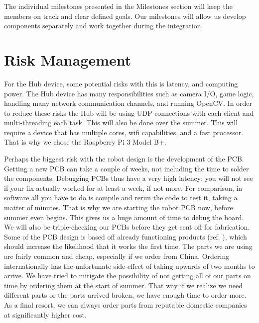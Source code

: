 \documentclass[11pt]{ieeeconf}
\begin{document}
The individual milestones presented in the Milestones section will keep the members on track and clear defined goals. Our milestones will allow us develop components separately and work together during the integration. 

\section{Risk Management}

For the Hub device, some potential risks with this is latency, and computing power. The Hub device has many responsibilities such as camera I/O, game logic, handling many network communication channels, and running OpenCV. In order to reduce these risks the Hub will be using UDP connections with each client and multi-threading each task. This will also be done over the summer. This will require a device that has multiple cores, wifi capabilities, and a fast processor. That is why we chose the Raspberry Pi 3 Model B+.

Perhaps the biggest risk with the robot design is the development of the PCB. Getting a new PCB can take a couple of weeks, not including the time to solder the components. Debugging PCBs thus have a very high latency; you will not see if your fix actually worked for at least a week, if not more. For comparison, in software all you have to do is compile and rerun the code to test it, taking a matter of minutes. That is why we are starting the robot PCB now, before summer even begins. This gives us a huge amount of time to debug the board. We will also be triple-checking our PCBs before they get sent off for fabrication. Some of the PCB design is based off already functioning products (ref. \cite{feather}), which should increase the likelihood that it works the first time. The parts we are using are fairly common and cheap, especially if we order from China. Ordering internationally has the unfortunate side-effect of taking upwards of two months to arrive. We have tried to mitigate the possibility of not getting all of our parts on time by ordering them at the start of summer. That way if we realize we need different parts or the parts arrived broken, we have enough time to order more. As a final resort, we can always order parts from reputable domestic companies at significantly higher cost.
\end{document}
